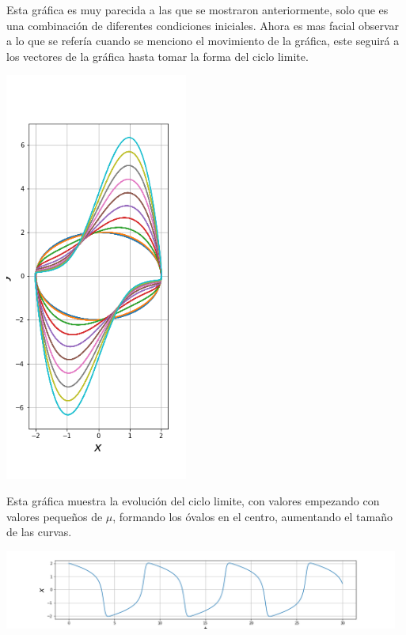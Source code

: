 \documentclass{article}
\begin{document}
Esta gráfica es muy parecida a las que se mostraron anteriormente, solo que es una combinación de diferentes condiciones iniciales. Ahora es mas facial observar a lo que se refería cuando se menciono el movimiento de la gráfica, este seguirá a los vectores de la gráfica hasta tomar la forma del ciclo limite. 

\begin{center}
	\includegraphics[width=6cm]{SegundaFig.png}
    
\end{center}
\vspace{0.3cm}

Esta gráfica muestra la evolución del ciclo limite, con valores empezando con valores pequeños de $\mu$, formando los óvalos en el centro, aumentando el tamaño de las curvas.

\vspace{2cm}

\begin{center}
	\includegraphics[width=13cm]{TerceraFig.png}
    
\end{center}
\vspace{0.3cm}
\end{document}
